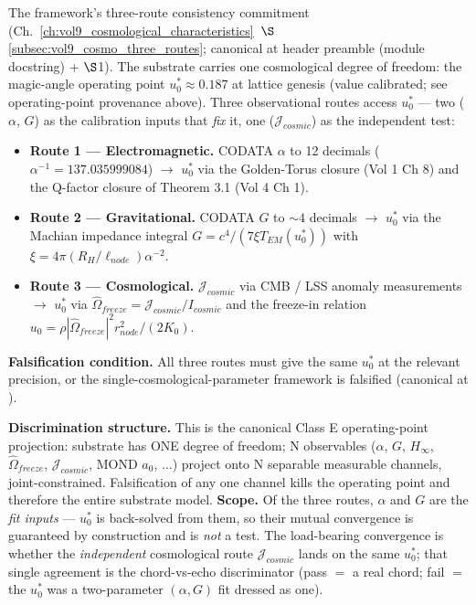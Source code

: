 \noindent The framework's three-route consistency commitment (Ch.~\ref{ch:vol9_cosmological_characteristics}~$\S$\ref{subsec:vol9_cosmo_three_routes}; canonical at  header preamble (module docstring) +  $\S$1). The substrate carries one cosmological degree of freedom: the magic-angle operating point $u_0^* \approx 0.187$ at lattice genesis (value calibrated; see operating-point provenance above). Three observational routes access $u_0^*$ --- two ($\alpha$, $G$) as the calibration inputs that \emph{fix} it, one ($\mathcal{J}_{cosmic}$) as the independent test:

\begin{itemize}
    \item \textbf{Route 1 --- Electromagnetic.} CODATA $\alpha$ to 12 decimals ($\alpha^{-1} = 137.035999084$) $\to$ $u_0^*$ via the Golden-Torus closure (Vol 1 Ch 8) and the Q-factor closure of Theorem 3.1 (Vol 4 Ch 1).
    \item \textbf{Route 2 --- Gravitational.} CODATA $G$ to $\sim 4$ decimals $\to$ $u_0^*$ via the Machian impedance integral $G = c^4/(7\xi T_{EM}(u_0^*))$ with $\xi = 4\pi(R_H/\ell_{node})\alpha^{-2}$.
    \item \textbf{Route 3 --- Cosmological.} $\mathcal{J}_{cosmic}$ via CMB / LSS anomaly measurements $\to$ $u_0^*$ via $\hat{\Omega}_{freeze} = \mathcal{J}_{cosmic}/I_{cosmic}$ and the freeze-in relation $u_0 = \rho|\hat{\Omega}_{freeze}|^2 r_{node}^2/(2 K_0)$.
\end{itemize}

\textbf{Falsification condition.} All three routes must give the same $u_0^*$ at the relevant precision, or the single-cosmological-parameter framework is falsified (canonical at ).

\textbf{Discrimination structure.} This is the canonical Class E operating-point projection: substrate has ONE degree of freedom; N observables ($\alpha$, $G$, $H_\infty$, $\hat{\Omega}_{freeze}$, $\mathcal{J}_{cosmic}$, MOND $a_0$, $\ldots$) project onto N separable measurable channels, joint-constrained. Falsification of any one channel kills the operating point and therefore the entire substrate model. \textbf{Scope.} Of the three routes, $\alpha$ and $G$ are the \emph{fit inputs} --- $u_0^*$ is back-solved from them, so their mutual convergence is guaranteed by construction and is \emph{not} a test. The load-bearing convergence is whether the \emph{independent} cosmological route $\mathcal{J}_{cosmic}$ lands on the same $u_0^*$; that single agreement is the chord-vs-echo discriminator (pass $=$ a real chord; fail $=$ the $u_0^*$ was a two-parameter $(\alpha,G)$ fit dressed as one).

